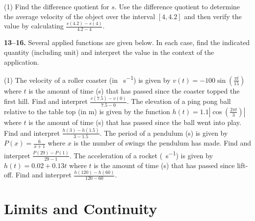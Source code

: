 \documentclass[10pt,oneside,]{book}
\theoremstyle{plain}
\theoremstyle{definition}
\numberwithin{equation}{section}
\newcommand{\fe}[2]{#1\mathopen{}\left(#2\right)\mathclose{}}
\newcommand{\cinterval}[2]{\left[#1,#2\right]}
\newcommand{\abs}[1]{\left|#1\right|}
\begin{document}
\par
\begin{exercisegroup}(1)
\exercise[11.]\hypertarget{exercise-40}{\null}Find the difference quotient for \(s\).%
\exercise[12.]\hypertarget{exercise-41}{\null}Use the difference quotient to determine the average velocity of the object over the interval \(\cinterval{4}{4.2}\) and then verify the value by calculating \(\frac{\fe{s}{4.2}-\fe{s}{4}}{4.2-4}\).%
\end{exercisegroup}
\par\smallskip\noindent
\textbf{13--16. }\hypertarget{exercisegroup-12}{\null}Several applied functions are given below.  In each case, find the indicated quantity (including unit) and interpret the value in the context of the application.%
\par
\begin{exercisegroup}(1)
\exercise[13.]\hypertarget{exercise-42}{\null}The velocity of a roller coaster (in \si{\foot\per\second}) is given by \(\fe{v}{t}=-100\fe{\sin}{\frac{\pi t}{15}}\) where \(t\) is the amount of time (\si{\second}) that has passed since the coaster topped the first hill.  Find and interpret \(\frac{\fe{v}{7.5}-\fe{v}{0}}{7.5-0}\).%
\exercise[14.]\hypertarget{exercise-43}{\null}The elevation of a ping pong ball relative to the table top (in \si{\meter}) is given by the function \(\fe{h}{t}=1.1\abs{\fe{\cos}{\frac{2\pi t}{3}}}\) where \(t\) is the amount of time (\si{\second}) that has passed since the ball went into play.  Find and interpret \(\frac{\fe{h}{3}-\fe{h}{1.5}}{3-1.5}\).%
\exercise[15.]\hypertarget{exercise-44}{\null}The period of a pendulum (\si{\second}) is given by \(\fe{P}{x}=\frac{6}{x+1}\) where \(x\) is the number of swings the pendulum has made.  Find and interpret \(\frac{\fe{P}{29}-\fe{P}{1}}{29-1}\).%
\exercise[16.]\hypertarget{exercise-45}{\null}The acceleration of a rocket (\si{\mileperhour\per\second}) is given by \(\fe{h}{t}=0.02+0.13t\) where \(t\) is the amount of time (\si{\second}) that has passed since lift-off.  Find and interpret \(\frac{\fe{h}{120}-\fe{h}{60}}{120-60}\).%
\end{exercisegroup}
\par\smallskip\noindent
\typeout{************************************************}
\typeout{************************************************}
\chapter[Limits and Continuity]{Limits and Continuity}\label{chapter-limits}
\typeout{************************************************}
\typeout{************************************************}
\end{document}
